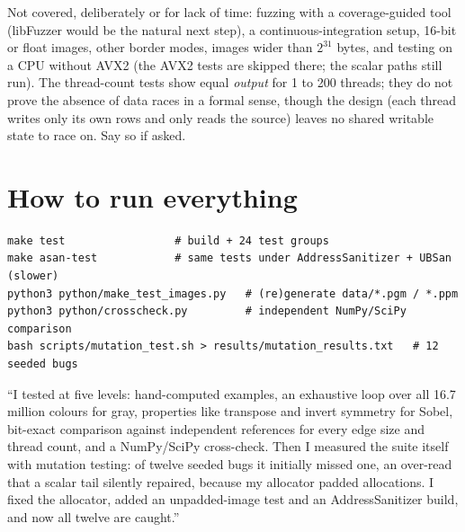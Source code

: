 \begin{warn}
Not covered, deliberately or for lack of time: fuzzing with a coverage-guided tool (libFuzzer would be the natural next step), a continuous-integration setup, 16-bit or float images, other border modes, images wider than $2^{31}$ bytes, and testing on a CPU without AVX2 (the AVX2 tests are skipped there; the scalar paths still run). The thread-count tests show equal \emph{output} for 1 to 200 threads; they do not prove the absence of data races in a formal sense, though the design (each thread writes only its own rows and only reads the source) leaves no shared writable state to race on. Say so if asked.
\end{warn}

\section{How to run everything}

\begin{lstlisting}[style=shell]
make test                 # build + 24 test groups
make asan-test            # same tests under AddressSanitizer + UBSan (slower)
python3 python/make_test_images.py   # (re)generate data/*.pgm / *.ppm
python3 python/crosscheck.py         # independent NumPy/SciPy comparison
bash scripts/mutation_test.sh > results/mutation_results.txt   # 12 seeded bugs
\end{lstlisting}

\begin{sound}
``I tested at five levels: hand-computed examples, an exhaustive loop over all 16.7 million colours for gray, properties like transpose and invert symmetry for Sobel, bit-exact comparison against independent references for every edge size and thread count, and a NumPy/SciPy cross-check. Then I measured the suite itself with mutation testing: of twelve seeded bugs it initially missed one, an over-read that a scalar tail silently repaired, because my allocator padded allocations. I fixed the allocator, added an unpadded-image test and an AddressSanitizer build, and now all twelve are caught.''
\end{sound}

